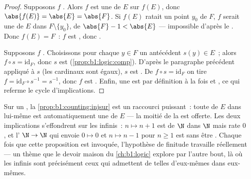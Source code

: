 \begin{proof}
Supposons $f$ . Alors $f$ est une  de $E$ sur $f(E)$,
donc $\abs{f(E)} = \abs{E} = \abs{F}$. Si $f(E)$ ratait un point $y_0$ de
$F$, $f$ serait une  de $E$ dans $F \setminus \{y_0\}$,
 de  $\abs{F} - 1 < \abs{E}$ --- impossible d'après le
. Donc $f(E) = F$~: $f$ est , donc
.

Supposons $f$ . Choisissons pour chaque $y \in F$ un antécédent
$s(y) \in E$~; alors $f \circ s = \mathrm{id}_F$, donc $s$ est 
(\cref{prop:b1:logic:comp}). D'après le paragraphe précédent appliqué à $s$
(les cardinaux sont égaux), $s$ est . De $f \circ s =
\mathrm{id}_F$ on tire $f = \mathrm{id}_F \circ s^{-1} = s^{-1}$, donc
$f$ est . Enfin, une   est par définition à la fois
 et , ce qui referme le cycle d'implications.
\end{proof}

\begin{example}\label{ex:b1:counting:finiteonly}
Sur un  \emph{}, la \cref{prop:b1:counting:injsur} est un
raccourci puissant~: toute   de $E$ dans lui-même est
automatiquement une  de $E$ --- la moitié de la 
est offerte. Les deux implications s'effondrent sur les 
infinis~: $n \mapsto n + 1$ est  de $\N$ dans $\N$ mais rate
$0$, et l' $\N \to \N$ qui envoie $0 \mapsto 0$ et
$n \mapsto n - 1$ pour $n \geq 1$ est  sans être .
Chaque fois que cette proposition est invoquée, l'hypothèse de finitude
travaille réellement --- un thème que le devoir maison du
\cref{ch:b1:logic} explore par l'autre bout, là où les 
infinis sont précisément ceux qui admettent de telles 
d'eux-mêmes dans eux-mêmes.
\end{example}


